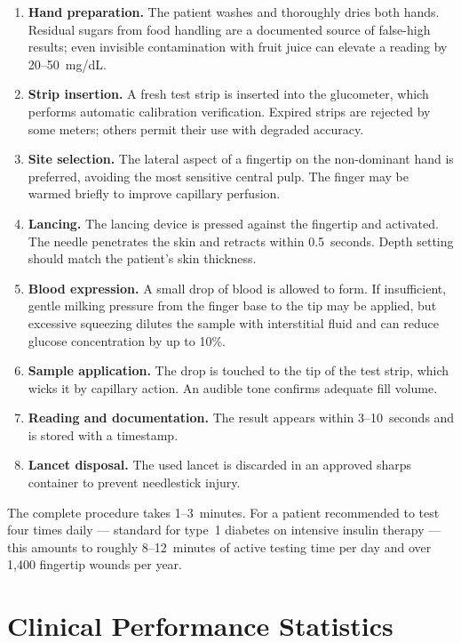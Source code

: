\begin{enumerate}
  \item \textbf{Hand preparation.} The patient washes and thoroughly dries both hands. Residual sugars from food handling are a documented source of false-high results; even invisible contamination with fruit juice can elevate a reading by 20--50~mg/dL.
  \item \textbf{Strip insertion.} A fresh test strip is inserted into the glucometer, which performs automatic calibration verification. Expired strips are rejected by some meters; others permit their use with degraded accuracy.
  \item \textbf{Site selection.} The lateral aspect of a fingertip on the non-dominant hand is preferred, avoiding the most sensitive central pulp. The finger may be warmed briefly to improve capillary perfusion.
  \item \textbf{Lancing.} The lancing device is pressed against the fingertip and activated. The needle penetrates the skin and retracts within 0.5~seconds. Depth setting should match the patient's skin thickness.
  \item \textbf{Blood expression.} A small drop of blood is allowed to form. If insufficient, gentle milking pressure from the finger base to the tip may be applied, but excessive squeezing dilutes the sample with interstitial fluid and can reduce glucose concentration by up to 10\%.
  \item \textbf{Sample application.} The drop is touched to the tip of the test strip, which wicks it by capillary action. An audible tone confirms adequate fill volume.
  \item \textbf{Reading and documentation.} The result appears within 3--10~seconds and is stored with a timestamp.
  \item \textbf{Lancet disposal.} The used lancet is discarded in an approved sharps container to prevent needlestick injury.
\end{enumerate}

The complete procedure takes 1--3~minutes. For a patient recommended to test four times daily --- standard for type~1 diabetes on intensive insulin therapy --- this amounts to roughly 8--12~minutes of active testing time per day and over 1,400 fingertip wounds per year.

\section{Clinical Performance Statistics}

